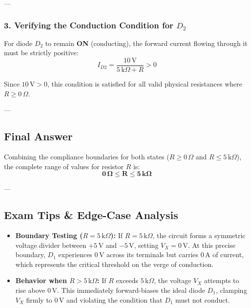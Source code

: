 \documentclass[12pt,a3paper]{article}
\begin{document}
\begin{enumerate}
\begin{tcolorbox}[enhanced,breakable,ansbox,colback=cA!4,colframe=cA,boxrule=0.8pt,arc=5pt,title={\textbf{Answer}},fonttitle=\bfseries\color{white},colbacktitle=cA]
---

\subsubsection*{3. Verifying the Conduction Condition for $D_2$}
For diode $D_2$ to remain \textbf{ON} (conducting), the forward current flowing through it must be strictly positive:
\begin{equation}
I_{D2} = \frac{10\,\text{V}}{5\,\text{k}\Omega + R} > 0
\end{equation}

Since $10\,\text{V} > 0$, this condition is satisfied for all valid physical resistances where $R \ge 0\,\Omega$.

---

\subsection*{Final Answer}
Combining the compliance boundaries for both states ($R \ge 0\,\Omega$ and $R \le 5\,\text{k}\Omega$), the complete range of values for resistor $R$ is:
\begin{equation}
\mathbf{0\,\Omega \le R \le 5\,\text{k}\Omega}
\end{equation}

---

\subsection*{Exam Tips \& Edge-Case Analysis}
\begin{itemize}
    \item \textbf{Boundary Testing ($R = 5\,\text{k}\Omega$):} If $R = 5\,\text{k}\Omega$, the circuit forms a symmetric voltage divider between $+5\,\text{V}$ and $-5\,\text{V}$, setting $V_X = 0\,\text{V}$. At this precise boundary, $D_1$ experiences $0\,\text{V}$ across its terminals but carries $0\,\text{A}$ of current, which represents the critical threshold on the verge of conduction.
    \item \textbf{Behavior when $R > 5\,\text{k}\Omega$:} If $R$ exceeds $5\,\text{k}\Omega$, the voltage $V_X$ attempts to rise above $0\,\text{V}$. This immediately forward-biases the ideal diode $D_1$, clamping $V_X$ firmly to $0\,\text{V}$ and violating the condition that $D_1$ must not conduct.
\end{itemize}

\end{tcolorbox}


\end{enumerate}
\end{document}
